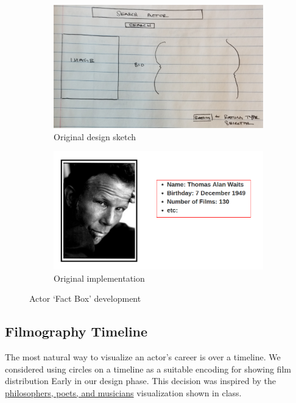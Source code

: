 \documentclass[12pt]{article}
\begin{document}
		\begin{figure}[h!]
			\centering
			\begin{subfigure}[t]{.5\textwidth}
				  \centering
				  \includegraphics[width=\linewidth]{images/actorFactBox_crop.png}
				  \caption{Original design sketch}
				  \label{fig:sub1}
			\end{subfigure}%
			\begin{subfigure}[t]{.5\textwidth}
				  \centering
				  \includegraphics[width=.8\linewidth]{images/actorBox.png}
				  \caption{Original implementation}
				  \label{fig:sub2}
			\end{subfigure}%
			\caption{Actor `Fact Box' development}
			\label{fig:actorFactBox}
		\end{figure}

\newpage

\subsection{Filmography Timeline}


The most natural way to visualize an actor's career is over a timeline.  We considered using circles on a timeline as a suitable encoding for showing film distribution Early in our design phase.  This decision was inspired by the \href{http://mariandoerk.de/edgemaps/demo/#phils;time;;;}{philosophers, poets, and musicians}  visualization shown in class. 
\end{document}

